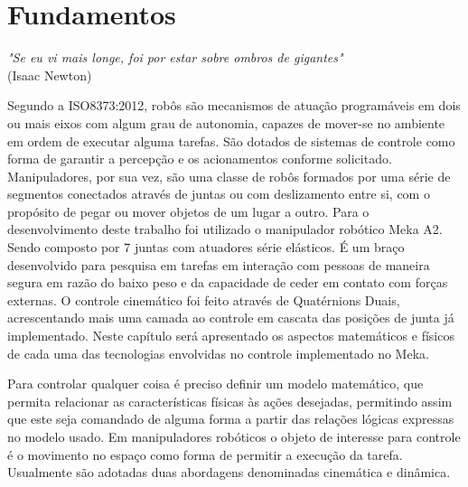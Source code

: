 \chapter{Fundamentos}\label{ch:teory-reference}

\begin{flushright}
\textit{"Se eu vi mais longe, foi por estar sobre ombros de gigantes"}\\ (Isaac Newton)
\end{flushright}



Segundo a ISO8373:2012, robôs são mecanismos de atuação programáveis em dois ou mais eixos com algum grau de autonomia, capazes de mover-se no ambiente em ordem de executar alguma tarefas. São dotados de sistemas de controle como forma de garantir a percepção e os acionamentos conforme solicitado. Manipuladores, por sua vez, são uma classe de robôs formados por uma série de segmentos conectados através de juntas ou com deslizamento entre si, com o propósito de pegar ou mover objetos de um lugar a outro. Para o desenvolvimento deste trabalho foi utilizado o manipulador robótico Meka A2. Sendo composto por 7 juntas com atuadores série elásticos. É um braço desenvolvido para pesquisa em tarefas em interação com pessoas de maneira segura em razão do baixo peso e da capacidade de ceder em contato com forças externas. O controle cinemático foi feito através de Quatérnions Duais, acrescentando mais uma camada ao controle em cascata das posições de junta já implementado. Neste capítulo será apresentado os aspectos matemáticos e físicos de cada uma das tecnologias envolvidas no controle implementado no Meka. 

Para controlar qualquer coisa é preciso definir um modelo matemático, que permita relacionar as características físicas às ações desejadas, permitindo assim que este seja comandado de alguma forma a partir das relações lógicas expressas no modelo usado. Em manipuladores robóticos o objeto de interesse para controle é o movimento no espaço como forma de permitir a execução da tarefa. Usualmente são adotadas duas abordagens denominadas cinemática e dinâmica.


